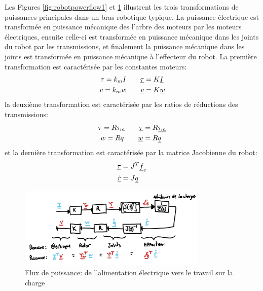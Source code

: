 Les Figures \ref{fig:robotpowerflow1} et \ref{fig:robotpowerflow2} illustrent les trois transformations de puissances principales dans un bras robotique typique. La puissance électrique est transformée en puissance mécanique des l'arbre des moteurs par les moteurs électriques, ensuite celle-ci est transformée en puissance mécanique dans les joints du robot par les transmissions, et finalement la puissance mécanique dans les joints est transformée en puissance mécanique à l'effecteur du robot. La première transformation est caractérisée par les constantes moteurs:
\begin{align}
	\tau = k_m I \quad \quad  \underline{\tau} &= K \underline{I} \\
	v = k_m w \quad \quad  \underline{v} &= K \underline{w}
\end{align}
la deuxième transformation est caractérisée par les ratios de réductions des transmissions:
\begin{align}
	\tau = R \tau_m \quad \quad  \underline{\tau} &= R \underline{\tau_m } \\
	w = R q \quad \quad  \underline{w} &= R \underline{q}
\end{align}
et la dernière transformation est caractérisée par la matrice Jacobienne du robot:
\begin{align}
	\underline{\tau} &= J^T \underline{f}_e \\
	\underline{\dot{r}} &= J \underline{q}
\end{align}

\begin{figure}[htpb]
	\centering
	\includegraphics[width=0.80\textwidth]{fig/robotpowerflow2.jpg}
	\caption{Flux de puissance: de l'alimentation électrique vers le travail sur la charge}
	\label{fig:robotpowerflow2}
\end{figure}





